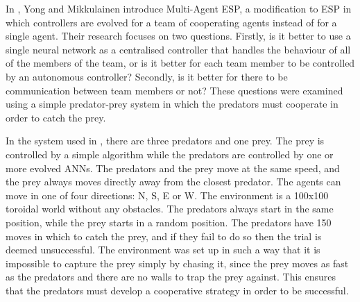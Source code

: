 \documentclass[12pt]{article} %
\begin{document}
In \cite{Yong2001}, Yong and Mikkulainen introduce Multi-Agent ESP, a modification to ESP in which controllers are evolved for a team of cooperating agents instead of for a single agent. Their research focuses on two questions. Firstly, is it better to use a single neural network as a centralised controller that handles the behaviour of all of the members of the team, or is it better for each team member to be controlled by an autonomous controller? Secondly, is it better for there to be communication between team members or not? These questions were examined using a simple predator-prey system in which the predators must cooperate in order to catch the prey.

In the system used in \cite{Yong2001}, there are three predators and one prey. The prey is controlled by a simple algorithm while the predators are controlled by one or more evolved ANNs. The predators and the prey move at the same speed, and the prey always moves directly away from the closest predator. The agents can move in one of four directions: N, S, E or W. The environment is a 100x100 toroidal world without any obstacles. The predators always start in the same position, while the prey starts in a random position. The predators have 150 moves in which to catch the prey, and if they fail to do so then the trial is deemed unsuccessful. The environment was set up in such a way that it is impossible to capture the prey simply by chasing it, since the prey moves as fast as the predators and there are no walls to trap the prey against. This ensures that the predators must develop a cooperative strategy in order to be successful.
\end{document}
